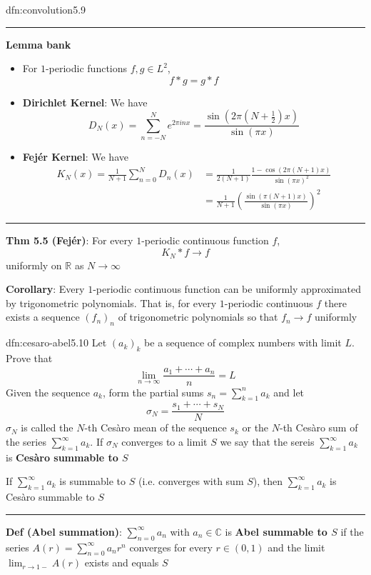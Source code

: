 \documentclass[landscape, 8pt]{extarticle}
\begin{document}
\begin{multicols}{3}
\begin{dfn}[Convolution]{dfn:convolution}{5.9}
	\noindent\rule{\textwidth}{0.2pt}
	\textbf{Lemma bank}
	\begin{itemize}
	    \setlength\itemsep{0em}
	    \item[\textbf{5.2}] For $1$-periodic functions $f, g\in L^{2}$,
			\[f * g = g * f\]
		\item[\textbf{5.3}] \textbf{Dirichlet Kernel}: We have
			\[D_{N}(x) = \sum_{n = -N}^{N} e^{2 \pi inx} = \frac{\sin(2 \pi(N + \frac{1}{2})x)}{\sin( \pi x)}\]
		\item[\textbf{5.4}] \textbf{Fejér Kernel}:  We have
			\begin{align*}
				K_{N}(x) = \frac{1}{N+1} \sum_{n = 0}^{N} D_{n}(x) &= \frac{1}{2(N+1)} \frac{1 - \cos(2\pi(N + 1)x)}{\sin(\pi x)^{2}}\\
						 &= \frac{1}{N+1} \left( \frac{\sin(\pi(N + 1) x)}{\sin(\pi x)}\right)^{2}
			\end{align*}
	\end{itemize}
	\noindent\rule{\textwidth}{0.2pt}
	\textbf{Thm 5.5 (Fejér)}: For every $1$-periodic continuous function $f$,
	\[K_{N} * f \to f\]
	uniformly on $\mathbb{R}$ as $N\to\infty$

	\textbf{Corollary}: Every $1$-periodic continuous function can be uniformly approximated by trigonometric polynomials. That is, for every $1$-periodic continuous $f$ there exists a sequence $(f_{n})_{n}$ of trigonometric polynomials so that $f_{n} \to f$ uniformly

\end{dfn}

\begin{dfn}{dfn:cesaro-abel}{5.10}
	Let $(a_{k})_{k}$ be a sequence of complex numbers with limit $L$. Prove that
	\[\lim_{n\to \infty} \frac{a_{1} + \cdots + a_{n}}{n} = L\]
	Given the sequence $a_{k}$, form the partial sums $s_{n} = \sum_{k = 1}^{n} a_{k}$ and let
	\[\sigma_{N} = \frac{s_{1} + \cdots + s_{N}}{N}\]
	$\sigma_{N}$ is called the $N$-th Cesàro mean of the sequence $s_{k}$ or the $N$-th Cesàro sum of the series $\sum_{k = 1}^{\infty} a_{k}$. If $\sigma_{N}$ converges to a limit $S$ we say that the sereis $\sum_{k = 1}^{\infty} a_{k}$ is \textbf{Cesàro summable to $S$}

	If $\sum_{k = 1}^{\infty} a_{k}$ is summable to $S$ (i.e. converges with sum $S$), then $\sum_{k = 1}^{\infty} a_{k}$ is Cesàro summable to $S$

	\noindent\rule{\textwidth}{0.2pt}
	\textbf{Def (Abel summation)}: $\sum_{n = 0}^{\infty}a_{n}$ with $a_{n}\in \mathbb{C}$ is \textbf{Abel summable to $S$} if the series $A(r) = \sum_{n = 0}^{\infty}a_{n}r^{n}$ converges for every $r\in(0,1)$ and the limit $\lim_{r\to 1-} A(r)$ exists and equals $S$
\end{dfn}


\end{multicols}
\end{document}
